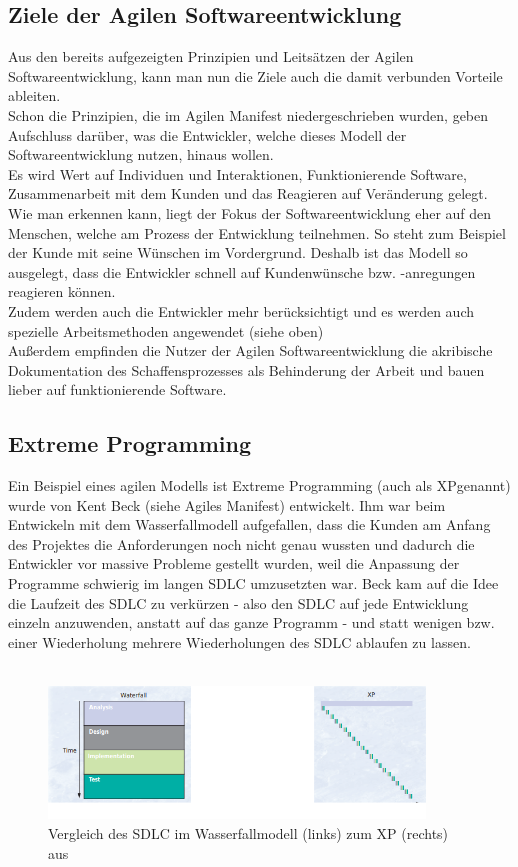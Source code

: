 \documentclass[a4paper, 10pt]{scrartcl}
\begin{document}
\subsection{Ziele der Agilen Softwareentwicklung}
Aus den bereits aufgezeigten Prinzipien und Leitsätzen der Agilen Softwareentwicklung, kann man nun die Ziele  auch die damit verbunden Vorteile ableiten. \\
Schon die Prinzipien, die im \glqq{}Agilen Manifest\grqq{} niedergeschrieben wurden, geben Aufschluss darüber, was die Entwickler, welche dieses Modell der Softwareentwicklung nutzen, hinaus wollen.\\ Es wird Wert auf \glqq{}Individuen und Interaktionen, Funktionierende Software, Zusammenarbeit mit dem Kunden und das Reagieren auf Veränderung\grqq{} gelegt. Wie man erkennen kann, liegt der Fokus der Softwareentwicklung eher auf den Menschen, welche am Prozess der Entwicklung teilnehmen. So steht zum Beispiel der Kunde mit seine Wünschen im Vordergrund. Deshalb ist das Modell so ausgelegt, dass die Entwickler schnell auf Kundenwünsche bzw. -anregungen reagieren können.\\ Zudem werden auch die Entwickler mehr berücksichtigt und es werden auch spezielle Arbeitsmethoden angewendet (siehe oben)\\Außerdem empfinden die Nutzer der Agilen Softwareentwicklung die akribische Dokumentation des Schaffensprozesses als Behinderung der Arbeit und bauen lieber auf \glqq funktionierende Software\grqq. \\ 

\subsection{Extreme Programming}
Ein Beispiel eines agilen Modells ist Extreme Programming (auch als \glqq XP\grqq genannt) wurde von Kent Beck (siehe \glqq Agiles Manifest\grqq) entwickelt. Ihm war beim Entwickeln mit dem Wasserfallmodell aufgefallen, dass die Kunden am Anfang des Projektes die Anforderungen noch nicht genau wussten und dadurch die Entwickler vor massive Probleme gestellt wurden, weil die Anpassung der Programme schwierig im langen SDLC umzusetzten war. Beck kam auf die Idee die Laufzeit des SDLC zu verkürzen - also den SDLC auf jede Entwicklung einzeln anzuwenden, anstatt auf das ganze Programm - und statt wenigen bzw. einer Wiederholung mehrere Wiederholungen des SDLC ablaufen zu lassen.\\\\
\begin{figure}
\begin{center}
\includegraphics[width=10cm]{xp2.png}
\caption{Vergleich des SDLC im Wasserfallmodell (links) zum XP (rechts) aus \cite{beck1999}}
\end{center}
\end{figure}
\end{document}
